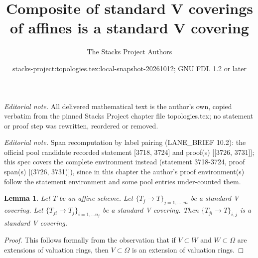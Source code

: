 \documentclass[10pt,a4paper]{amsart}
\title{Composite of standard V coverings of affines is a standard V covering}
\author{The Stacks Project Authors}
\date{stacks-project:topologies.tex:local-snapshot-20261012; GNU FDL 1.2 or later}
\theoremstyle{plain}
\newtheorem{lemma}[subsection]{Lemma}
\theoremstyle{definition}
\theoremstyle{remark}
\numberwithin{equation}{subsection}
\begin{document}
\maketitle
\noindent\textit{Editorial note.} All delivered mathematical text is the author's own, copied verbatim from the pinned Stacks Project chapter file topologies.tex; no statement or proof step was rewritten, reordered or removed.\par\medskip
\noindent\textit{Editorial note.} Span recomputation by label pairing (LANE\_BRIEF 10.2): the official pool candidate recorded statement [3718, 3724] and proof(s) [[3726, 3731]]; this spec covers the complete environment instead (statement 3718-3724, proof span(s) [(3726, 3731)]), since in this chapter the author's proof environment(s) follow the statement environment and some pool entries under-counted them.\par\medskip
\begin{lemma}
\label{lemma-composition-standard-V}
Let $T$ be an affine scheme. Let $\{T_j \to T\}_{j = 1, \ldots, m}$
be a standard V covering. Let $\{T_{ji} \to T_j\}_{i = 1, \ldots n_j}$
be a standard V covering. Then $\{T_{ji} \to T\}_{i, j}$
is a standard V covering.
\end{lemma}

\begin{proof}
This follows formally from the observation that if
$V \subset W$ and $W \subset \Omega$ are extensions of
valuation rings, then $V \subset \Omega$ is an extension
of valuation rings.
\end{proof}
\end{document}
